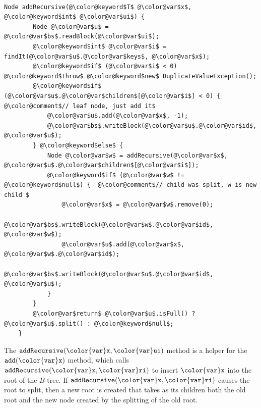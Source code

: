 \documentclass[10pt]{book}
\theoremstyle{plain}
\theoremstyle{definition}
\begin{document}
 \ \vspace{.5ex}\begin{Verbatim}[gobble=1,tabsize=2,frame=single,framerule=1.2pt,commandchars=\\@\$,label=\texttt{BTree},labelposition=topline]
	Node addRecursive(@\color@keyword$T$ @\color@var$x$, @\color@keyword$int$ @\color@var$ui$) {
		Node @\color@var$u$ = @\color@var$bs$.readBlock(@\color@var$ui$);
		@\color@keyword$int$ @\color@var$i$ = findIt(@\color@var$u$.@\color@var$keys$, @\color@var$x$);
		@\color@keyword$if$ (@\color@var$i$ < 0) @\color@keyword$throw$ @\color@keyword$new$ DuplicateValueException();
		@\color@keyword$if$ (@\color@var$u$.@\color@var$children$[@\color@var$i$] < 0) { @\color@comment$// leaf node, just add it$
			@\color@var$u$.add(@\color@var$x$, -1);
			@\color@var$bs$.writeBlock(@\color@var$u$.@\color@var$id$, @\color@var$u$);
		} @\color@keyword$else$ {
			Node @\color@var$w$ = addRecursive(@\color@var$x$, @\color@var$u$.@\color@var$children$[@\color@var$i$]);
			@\color@keyword$if$ (@\color@var$w$ != @\color@keyword$null$) {  @\color@comment$// child was split, w is new child $
				@\color@var$x$ = @\color@var$w$.remove(0);
				@\color@var$bs$.writeBlock(@\color@var$w$.@\color@var$id$, @\color@var$w$);
				@\color@var$u$.add(@\color@var$x$, @\color@var$w$.@\color@var$id$);
				@\color@var$bs$.writeBlock(@\color@var$u$.@\color@var$id$, @\color@var$u$);
			}
		}
		@\color@var$return$ @\color@var$u$.isFull() ? @\color@var$u$.split() : @\color@keyword$null$;
	}
\end{Verbatim}


The \ensuremath{\mathtt{addRecursive({\color{var}x},{\color{var}ui})}} method is a helper for the \ensuremath{\mathtt{add({\color{var}x})}} method, which
calls \ensuremath{\mathtt{addRecursive({\color{var}x},{\color{var}ri})}} to insert \ensuremath{\mathtt{{\color{var}x}}} into the root of the $B$-tree.
If \ensuremath{\mathtt{addRecursive({\color{var}x},{\color{var}ri})}} causes the root to split, then a new root is
created that takes as its children both the old root and the new node
created by the splitting of the old root.
\end{document}
